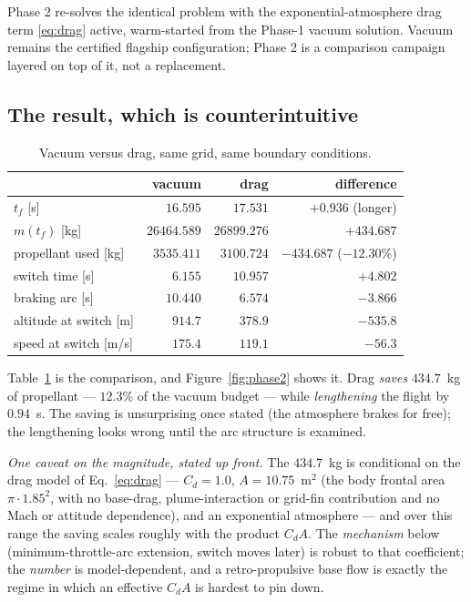 \documentclass[11pt]{article}
\begin{document}
Phase 2 re-solves the identical problem with the exponential-atmosphere drag
term \eqref{eq:drag} active, warm-started from the Phase-1 vacuum solution.
Vacuum remains the certified flagship configuration; Phase 2 is a comparison
campaign layered on top of it, not a replacement.

\subsection{The result, which is counterintuitive}

\begin{table}[htbp]
\centering
\caption{Vacuum versus drag, same grid, same boundary conditions.}
\label{tab:phase2}
\begin{tabular}{lrrr}
\toprule
& vacuum & drag & difference \\
\midrule
$t_f$ [s] & $16.595$ & $17.531$ & $+0.936$ (longer) \\
$m(t_f)$ [kg] & $26464.589$ & $26899.276$ & $+434.687$ \\
propellant used [kg] & $3535.411$ & $3100.724$ & $-434.687$ ($-12.30\%$) \\
switch time [s] & $6.155$ & $10.957$ & $+4.802$ \\
braking arc [s] & $10.440$ & $6.574$ & $-3.866$ \\
altitude at switch [m] & $914.7$ & $378.9$ & $-535.8$ \\
speed at switch [m/s] & $175.4$ & $119.1$ & $-56.3$ \\
\bottomrule
\end{tabular}
\end{table}

Table~\ref{tab:phase2} is the comparison, and Figure~\ref{fig:phase2}
shows it. Drag \emph{saves} $434.7$~kg of propellant --- $12.3\%$ of the vacuum
budget --- while \emph{lengthening} the flight by $0.94$~s. The saving is
unsurprising once stated (the atmosphere brakes for free); the lengthening
looks wrong until the arc structure is examined.

\emph{One caveat on the magnitude, stated up front.} The $434.7$~kg is
conditional on the drag model of Eq.~\eqref{eq:drag} --- $C_d = 1.0$,
$A = 10.75$~m$^2$ (the body frontal area $\pi\cdot 1.85^2$, with no
base-drag, plume-interaction or grid-fin contribution and no Mach or
attitude dependence), and an exponential atmosphere --- and over this range
the saving scales roughly with the product $C_d A$. The
\emph{mechanism} below (minimum-throttle-arc extension, switch moves later)
is robust to that coefficient; the \emph{number} is model-dependent, and a
retro-propulsive base flow is exactly the regime in which an effective
$C_d A$ is hardest to pin down.
\end{document}
